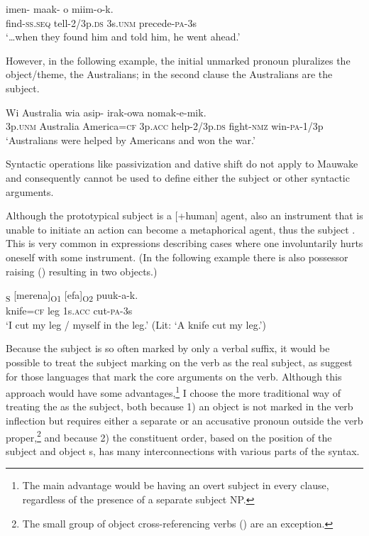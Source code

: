 \ea%
\label{ex:5:x921}
\gll {\dots}imen-  maak-  o  miim-o-k. \\
     find-\textsc{ss}.\textsc{seq}  tell-2/3p.\textsc{ds}  3s.\textsc{unm}  precede-\textsc{pa}-3s \\
\glt `{\dots}when they found him and told him, he went ahead.'
\z

However, in the following example, the initial unmarked pronoun   pluralizes the object/theme, the Australians; in the second clause the Australians are the subject.

\ea%
\label{ex:5:x922}
\gll Wi  Australia    wia  asip- irak-owa  nomak-e-mik. \\
     3p.\textsc{unm}  Australia  America=\textsc{cf}  3p.\textsc{acc}  help-2/3p.\textsc{ds} fight-\textsc{nmz}  win-\textsc{pa}-1/3p \\
\glt `Australians were helped by Americans and won the war.'
\z

Syntactic operations like passivization and dative shift do not apply to Mauwake and consequently cannot be used to define either the subject or other syntactic arguments. 

Although the prototypical subject is a [+human] agent, also an instrument that is unable to initiate an action can become a metaphorical agent, thus the subject \citep[106]{Givon1984}. This is very common in expressions describing cases where one involuntarily hurts oneself with some instrument. (In the following example there is also possessor raising () resulting in two objects.)

\ea%
\label{ex:5:x958}
\gll [\textstyleEmphasizedVernacularWords{Fura=ke}]\textsubscript{S}  [merena]\textsubscript{O1}  [efa]\textsubscript{O2}  puuk-a-k. \\
     knife=\textsc{cf}  leg  1s.\textsc{acc}  cut-\textsc{pa}-3s \\
\glt `I cut my leg / myself in the leg.' (Lit: `A knife cut my leg.')
\z

Because the subject is so often marked by only a verbal suffix, it would be possible to treat the subject marking on the verb as the real subject, as \citet[33--34]{VanValinEtAl1997} suggest for those languages that mark the core arguments on the verb. Although this approach would have some advantages,\footnote{The main advantage would be having an overt subject in every clause, regardless of the presence of a separate subject NP.} I choose the more traditional way of treating the  as the subject, both because 1) an object is not marked in the verb inflection but requires either a separate  or an accusative pronoun outside the verb proper,\footnote{The small group of object cross-referencing verbs () are an exception.} and because 2) the constituent order, based on the position of the subject and object s, has many interconnections with various parts of the syntax. 

